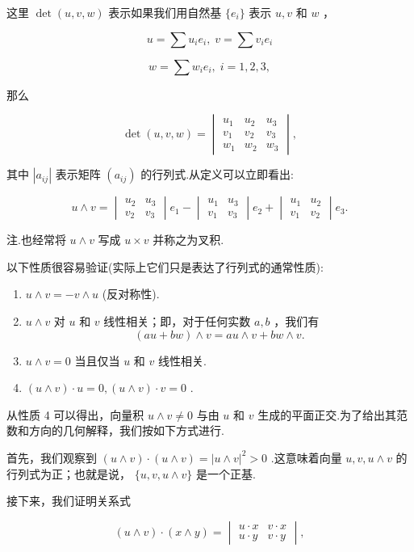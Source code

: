 这里 $\det(u,v,w)$ 表示如果我们用自然基 $\{e_i\}$ 表示 $u,v$ 和 $w$ ，

\[
u = \sum u_ie_i,\;v = \sum v_ie_i
\]

\[
w = \sum w_ie_i,\;i = 1,2,3,
\]

那么

\[
\det(u,v,w)  = \begin{vmatrix} u_1 & u_2 & u_3 \\  v_1 & v_2 & v_3 \\  w_1 & w_2 & w_3 \end{vmatrix} ,
\]

其中 $|a_{ij}|$ 表示矩阵 $(a_{ij})$ 的行列式.从定义可以立即看出:

\[
u \land  v = \begin{vmatrix} u_2 & u_3 \\  v_2 & v_3 \end{vmatrix} e_1 - \begin{vmatrix} u_1 & u_3 \\  v_1 & v_3 \end{vmatrix} e_2 + \begin{vmatrix} u_1 & u_2 \\  v_1 & v_2 \end{vmatrix} e_3. \tag{1}
\]

注.也经常将 $u \land  v$ 写成 $u \times  v$ 并称之为叉积.

以下性质很容易验证(实际上它们只是表达了行列式的通常性质):
\begin{enumerate}
    \item $u \land  v =  - v \land  u$ (反对称性).
    \item $u \land  v$ 对 $u$ 和 $v$ 线性相关；即，对于任何实数 $a,b$ ，我们有
    \[
    (au + bw)  \land  v = au \land  v + bw \land  v.
    \]
    \item $u \land  v = 0$ 当且仅当 $u$ 和 $v$ 线性相关.
    \item $(u \land  v)  \cdot  u = 0,(u \land  v)  \cdot  v = 0$ .
\end{enumerate}
从性质 4 可以得出，向量积 $u \land  v \neq  0$ 与由 $u$ 和 $v$ 生成的平面正交.为了给出其范数和方向的几何解释，我们按如下方式进行.

首先，我们观察到 $(u \land  v)  \cdot  (u \land  v)  = |u \land  v|^2 > 0$ .这意味着向量 $u,v,u \land  v$ 的行列式为正；也就是说， $\{ u,v,u \land  v\}$ 是一个正基.

接下来，我们证明关系式

\[
(u \land  v)  \cdot  (x \land  y)  = \begin{vmatrix} u \cdot  x & v \cdot  x \\  u \cdot  y & v \cdot  y \end{vmatrix} ,
\]

